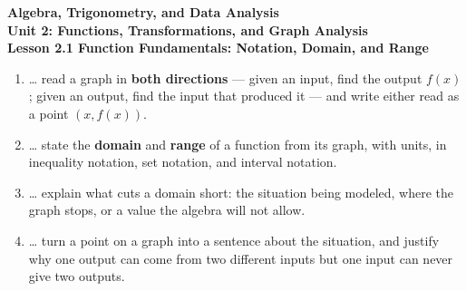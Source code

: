 \documentclass[10pt]{article}
\begin{document}
\vspace{-0.8in}

\begin{center}
  {\color{white}\textbf{\LARGE Algebra, Trigonometry, and Data Analysis}}\\[4pt]
  {\color{mistmid}\large\textbf{Unit 2: Functions, Transformations, and Graph Analysis}}\\[6pt]
  {\color{white}\textbf{\large Lesson 2.1 \quad Function Fundamentals: Notation, Domain, and Range}}
\end{center}

\vspace{0.22in}
\namedateperiod
\vspace{0.18in}

\begin{learningtargetbox}
\small
\begin{enumerate}[leftmargin=1.5em, itemsep=5pt]
  \item \ldots{} read a graph in \textbf{both directions} --- given an input, find the output
        $f(x)$; given an output, find the input that produced it --- and write either read as a
        point $(x, f(x))$.
  \item \ldots{} state the \textbf{domain} and \textbf{range} of a function from its graph, with
        units, in inequality notation, set notation, and interval notation.
  \item \ldots{} explain what cuts a domain short: the situation being modeled, where the graph
        stops, or a value the algebra will not allow.
  \item \ldots{} turn a point on a graph into a sentence about the situation, and justify why one
        output can come from two different inputs but one input can never give two outputs.
\end{enumerate}
\end{learningtargetbox}

\vspace{0.14in}
\end{document}
